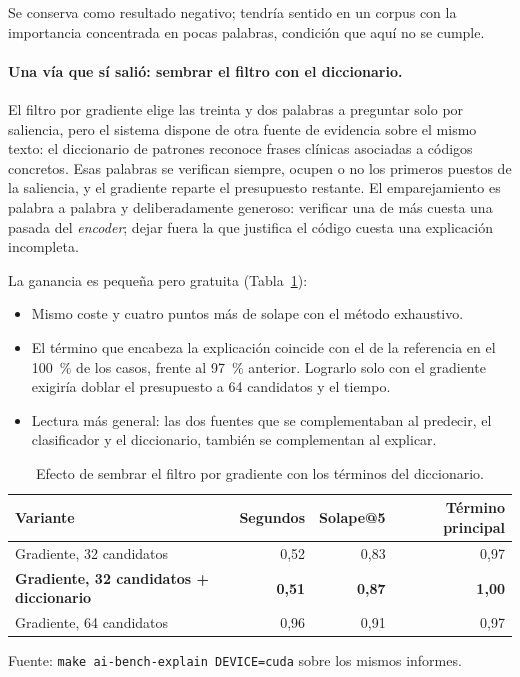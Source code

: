Se conserva como resultado negativo; tendría sentido en un corpus con la importancia concentrada en pocas palabras, condición que aquí no se cumple.


\paragraph{Una vía que sí salió: sembrar el filtro con el diccionario.}
El filtro por gradiente elige las treinta y dos palabras a preguntar solo por saliencia, pero el sistema dispone de otra fuente de evidencia sobre el mismo texto: el diccionario de patrones reconoce frases clínicas asociadas a códigos concretos. Esas palabras se verifican siempre, ocupen o no los primeros puestos de la saliencia, y el gradiente reparte el presupuesto restante. El emparejamiento es palabra a palabra y deliberadamente generoso: verificar una de más cuesta una pasada del \emph{encoder}; dejar fuera la que justifica el código cuesta una explicación incompleta.

La ganancia es pequeña pero gratuita (Tabla~\ref{tab:explain-diccionario}):

\begin{itemize}
 \item Mismo coste y cuatro puntos más de solape con el método exhaustivo.
 \item El término que encabeza la explicación coincide con el de la referencia en el 100~\% de los casos, frente al 97~\% anterior. Lograrlo solo con el gradiente exigiría doblar el presupuesto a 64 candidatos y el tiempo.
 \item Lectura más general: las dos fuentes que se complementaban al predecir, el clasificador y el diccionario, también se complementan al explicar.
\end{itemize}

\begin{table}[ht]
\centering
\small
\caption{Efecto de sembrar el filtro por gradiente con los términos del diccionario.}
\label{tab:explain-diccionario}
\begin{tabular}{lrrr}
\hline
\textbf{Variante} & \textbf{Segundos} & \textbf{Solape@5} & \textbf{Término principal} \\
\hline
Gradiente, 32 candidatos & 0{,}52 & 0{,}83 & 0{,}97 \\
\rowcolor{gray!15}
\textbf{Gradiente, 32 candidatos + diccionario} & \textbf{0{,}51} & \textbf{0{,}87} & \textbf{1{,}00} \\
Gradiente, 64 candidatos & 0{,}96 & 0{,}91 & 0{,}97 \\
\hline
\end{tabular}
\vspace{1mm}
{\footnotesize Fuente: \texttt{make ai-bench-explain DEVICE=cuda} sobre los mismos informes.}
\end{table}

